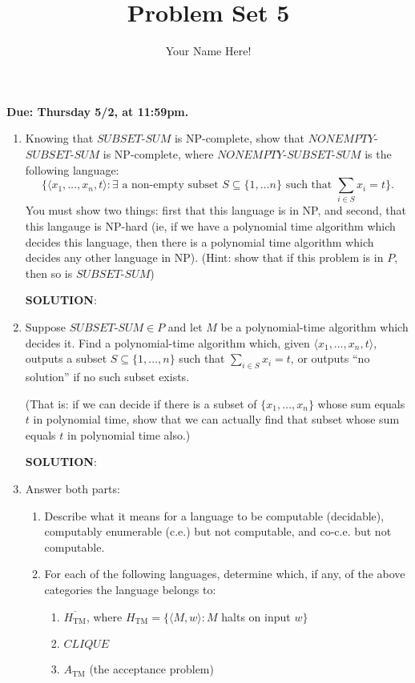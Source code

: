 \documentclass[12pt]{article}
\title{Problem Set 5}
\author{Your Name Here!}
\date{}
\newcommand{\sol}{\par{\bf SOLUTION}: }
\begin{document}
\maketitle

\noindent
    {\bf Due: Thursday 5/2, at 11:59pm. }
    
\begin{enumerate}
	
\item Knowing that $SUBSET$-$SUM$ is NP-complete, show that $NONEMPTY$-$SUBSET$-$SUM$ is NP-complete, where $NONEMPTY$-$SUBSET$-$SUM$ is the following language:
\begin{displaymath}
\{ \langle x_1, \ldots, x_n, t \rangle : \exists \text{ a non-empty subset } S \subseteq \{ 1, \ldots n \} \text{ such that } \sum\limits_{i \in S} x_i = t \}.
\end{displaymath} You must show two things: first that this language is in NP, and second, that this langauge is NP-hard (ie, if we have a polynomial time algorithm which decides this language, then there is a polynomial time algorithm which decides any other language in NP). (Hint: show that if this problem is in $P$, then so is $SUBSET$-$SUM$)

\sol %

\item Suppose $SUBSET$-$SUM \in P$ and let $M$ be a polynomial-time algorithm which decides it. Find a polynomial-time algorithm which, given $\langle x_1, \ldots, x_n, t \rangle$, outputs a subset $S \subseteq \{ 1, \ldots, n \}$ such that $\sum\limits_{i \in S} x_i = t$, or outputs ``no solution'' if no such subset exists.

(That is: if we can decide if there is a subset of $\{ x_1, \ldots, x_n \}$ whose sum equals $t$ in polynomial time, show that we can actually find that subset whose sum equals $t$ in polynomial time also.)

\sol %

\item Answer both parts:
\begin{enumerate}
	\item Describe what it means for a language to be computable (decidable), computably enumerable (c.e.) but not computable, and co-c.e. but not computable.
	\item For each of the following languages, determine which, if any, of the above categories the language belongs to:
	\begin{enumerate}
		\item $\overline{H_{\text{TM}}}$, where $H_\text{TM} = \{ \langle M, w \rangle : M $ halts on input $ w \}$
		\item $CLIQUE$
		\item $A_\text{TM}$ (the acceptance problem)
	\end{enumerate}
\end{enumerate}


\end{enumerate}
\end{document}
